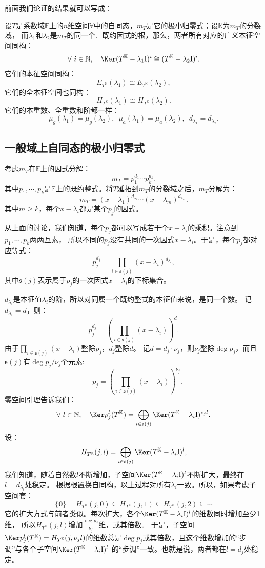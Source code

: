 \documentclass[12pt,UTF8]{ctexbook}
\begin{document}
前面我们论证的结果就可以写成：
\begin{pp}\label{pp:9_7_0}
设$T$是系数域$\mathbb{F}$上的$n$维空间$\mathbb{V}$中的自同态，$m_T$是它的极小归零式；设$\mathbb{K}$为$m_T$的分裂域，
而$\lambda_1$和$\lambda_2$是$m_T$的同一个$\mathbb{F}$-既约因式的根，那么，两者所有对应的广义本征空间同构：
$$ \forall \,\, i \in \mathbb{N}, \quad \Ker (T^{\mathbb{K}} - \lambda_1\mathrm{I})^i \cong (T^{\mathbb{K}} - \lambda_2\mathrm{I})^i. $$
它们的本征空间同构：
$$E_{T^{\mathbb{K}}}(\lambda_1) \cong E_{T^{\mathbb{K}}}(\lambda_2),$$
它们的全本征空间也同构：
$$H_{T^{\mathbb{K}}}(\lambda_1) \cong H_{T^{\mathbb{K}}}(\lambda_2).$$
它们的本重数、全重数和阶都一样：
$$ \mu_g(\lambda_1) = \mu_g(\lambda_2), \,\,\, \mu_a(\lambda_1) = \mu_a(\lambda_2), \,\,\, d_{\lambda_1} = d_{\lambda_2}.$$
\end{pp}

\subsection{一般域上自同态的极小归零式}
考虑$m_T$在$\mathbb{F}$上的因式分解：
$$ m_T = p_1^{d_1}\cdots p_k^{d_k}.$$
其中$p_1, \cdots , p_k$是$\mathbb{F}$上的既约整式。将$T$延拓到$m_T$的分裂域之后，$m_T$分解为：
$$ m_T = (x - \lambda_1)^{d_{\lambda_1}}\cdots (x - \lambda_m)^{d_{\lambda_m}}.$$
其中$m \geqslant k$，每个$x - \lambda_i$都是某个$p_j$的因式。

从上面的讨论，我们知道，每个$p_j$都可以写成若干个$x - \lambda_i$的乘积。注意到$p_1, \cdots , p_k$两两互素，
所以不同的$p_j$没有共同的一次因式$x - \lambda_i$。于是，每个$p_j$都对应等式：
$$ p_j^{d_j} = \prod_{i\in \mathfrak{s}(j)} (x - \lambda_i)^{d_{\lambda_i}},$$
其中$\mathfrak{s}(j)$表示属于$p_j$的一次因式$x - \lambda_i$的下标集合。

$d_{\lambda_i}$是本征值$\lambda_i$的阶，所以对同属一个既约整式的本征值来说，是同一个数。
记$d_{\lambda_i} = d$，则：
$$ p_j^{d_j} = \left(\prod_{i\in \mathfrak{s}(j)} (x - \lambda_i)\right)^d. $$
由于$\prod_{i\in \mathfrak{s}(j)} (x - \lambda_i)$整除$p_j$，$d_j$整除$d$。
记$d = d_j \cdot \nu_j$，则$\nu_j$整除$\deg p_j$，而且$\mathfrak{s}(j)$有$\deg p_j / \nu_j$个元素:
$$\quad p_j = \left(\prod_{i\in \mathfrak{s}(j)} (x - \lambda_i)\right)^{\nu_j}. $$
零空间引理告诉我们：
$$ \forall \,\,l \in\mathbb{N},\quad  \Ker p_j^{l}(T^{\mathbb{K}}) = \bigoplus_{i\in \mathfrak{s}(j)} \Ker (T^{\mathbb{K}} - \lambda_i\mathrm{I})^{\nu_j l}.$$
设：
$$ H_{T^{\mathbb{K}}}(j,l) = \bigoplus_{i\in \mathfrak{s}(j)} \Ker (T^{\mathbb{K}} - \lambda_i\mathrm{I})^{l},$$
我们知道，随着自然数$l$不断增加，子空间$\Ker (T^{\mathbb{K}} - \lambda_i\mathrm{I})^{l}$不断扩大，最终在$l = d_{\lambda_i}$处稳定。
根据根置换自同构，以上过程对所有$\lambda_i$一致。所以，如果考虑子空间套：
$$ \{\mathbf{0}\} = H_{T^{\mathbb{K}}}(j,0) \subseteq H_{T^{\mathbb{K}}}(j,1) \subseteq H_{T^{\mathbb{K}}}(j,2) \subseteq \cdots $$
它的扩大方式与前者类似。每次扩大，各个$\Ker (T^{\mathbb{K}} - \lambda_i\mathrm{I})^{l}$的维数同时增加至少1维，
所以$H_{T^{\mathbb{K}}}(j,l)$增加$\frac{\deg p_j}{\nu_j}$维，或其倍数。
于是，子空间$\Ker p_j^{l}(T^{\mathbb{K}}) = H_{T^{\mathbb{K}}}(j,\nu_j l)$的维数总是$\deg p_j$或其倍数，且这个维数增加的“步调”与各个子空间$\Ker (T^{\mathbb{K}} - \lambda_i\mathrm{I})^{l}$
的“步调”一致。也就是说，两者都在$l = d_j$处稳定。
\end{document}

